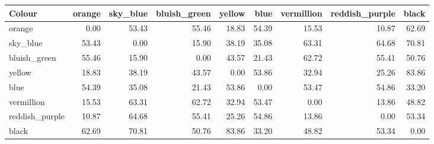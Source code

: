 \begin{tabular}{lrrrrrrrr}
\toprule
Colour & orange & sky\_blue & bluish\_green & yellow & blue & vermillion & reddish\_purple & black \\
\midrule
orange & 0.00 & 53.43 & 55.46 & 18.83 & 54.39 & 15.53 & 10.87 & 62.69 \\
sky\_blue & 53.43 & 0.00 & 15.90 & 38.19 & 35.08 & 63.31 & 64.68 & 70.81 \\
bluish\_green & 55.46 & 15.90 & 0.00 & 43.57 & 21.43 & 62.72 & 55.41 & 50.76 \\
yellow & 18.83 & 38.19 & 43.57 & 0.00 & 53.86 & 32.94 & 25.26 & 83.86 \\
blue & 54.39 & 35.08 & 21.43 & 53.86 & 0.00 & 53.47 & 54.86 & 33.20 \\
vermillion & 15.53 & 63.31 & 62.72 & 32.94 & 53.47 & 0.00 & 13.86 & 48.82 \\
reddish\_purple & 10.87 & 64.68 & 55.41 & 25.26 & 54.86 & 13.86 & 0.00 & 53.34 \\
black & 62.69 & 70.81 & 50.76 & 83.86 & 33.20 & 48.82 & 53.34 & 0.00 \\
\bottomrule
\end{tabular}
